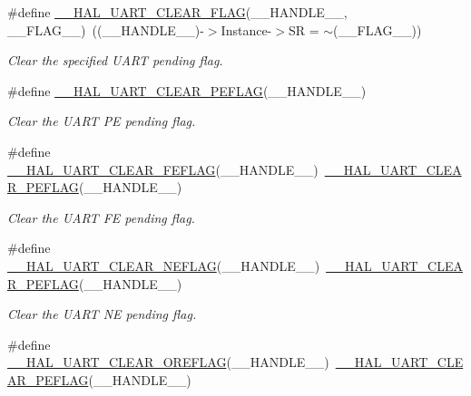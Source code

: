 \begin{DoxyCompactItemize}
\#define \hyperlink{group___u_a_r_t___exported___macros_ga9bd035161d41cde4f2568c7af06493bf}{\-\_\-\-\_\-\-H\-A\-L\-\_\-\-U\-A\-R\-T\-\_\-\-C\-L\-E\-A\-R\-\_\-\-F\-L\-A\-G}(\-\_\-\-\_\-\-H\-A\-N\-D\-L\-E\-\_\-\-\_\-, \-\_\-\-\_\-\-F\-L\-A\-G\-\_\-\-\_\-)~((\-\_\-\-\_\-\-H\-A\-N\-D\-L\-E\-\_\-\-\_\-)-\/$>$Instance-\/$>$S\-R = $\sim$(\-\_\-\-\_\-\-F\-L\-A\-G\-\_\-\-\_\-))
\begin{DoxyCompactList}\small\item\em Clear the specified U\-A\-R\-T pending flag. \end{DoxyCompactList}\item 
\#define \hyperlink{group___u_a_r_t___exported___macros_gaba5e19c60e0f37341b1585a380b84d49}{\-\_\-\-\_\-\-H\-A\-L\-\_\-\-U\-A\-R\-T\-\_\-\-C\-L\-E\-A\-R\-\_\-\-P\-E\-F\-L\-A\-G}(\-\_\-\-\_\-\-H\-A\-N\-D\-L\-E\-\_\-\-\_\-)
\begin{DoxyCompactList}\small\item\em Clear the U\-A\-R\-T P\-E pending flag. \end{DoxyCompactList}\item 
\#define \hyperlink{group___u_a_r_t___exported___macros_gae1dfc7777b089a10464841045b524caa}{\-\_\-\-\_\-\-H\-A\-L\-\_\-\-U\-A\-R\-T\-\_\-\-C\-L\-E\-A\-R\-\_\-\-F\-E\-F\-L\-A\-G}(\-\_\-\-\_\-\-H\-A\-N\-D\-L\-E\-\_\-\-\_\-)~\hyperlink{group___u_a_r_t___exported___macros_gaba5e19c60e0f37341b1585a380b84d49}{\-\_\-\-\_\-\-H\-A\-L\-\_\-\-U\-A\-R\-T\-\_\-\-C\-L\-E\-A\-R\-\_\-\-P\-E\-F\-L\-A\-G}(\-\_\-\-\_\-\-H\-A\-N\-D\-L\-E\-\_\-\-\_\-)
\begin{DoxyCompactList}\small\item\em Clear the U\-A\-R\-T F\-E pending flag. \end{DoxyCompactList}\item 
\#define \hyperlink{group___u_a_r_t___exported___macros_gaa1f69421585b3ada4d2b81d502a3ae6b}{\-\_\-\-\_\-\-H\-A\-L\-\_\-\-U\-A\-R\-T\-\_\-\-C\-L\-E\-A\-R\-\_\-\-N\-E\-F\-L\-A\-G}(\-\_\-\-\_\-\-H\-A\-N\-D\-L\-E\-\_\-\-\_\-)~\hyperlink{group___u_a_r_t___exported___macros_gaba5e19c60e0f37341b1585a380b84d49}{\-\_\-\-\_\-\-H\-A\-L\-\_\-\-U\-A\-R\-T\-\_\-\-C\-L\-E\-A\-R\-\_\-\-P\-E\-F\-L\-A\-G}(\-\_\-\-\_\-\-H\-A\-N\-D\-L\-E\-\_\-\-\_\-)
\begin{DoxyCompactList}\small\item\em Clear the U\-A\-R\-T N\-E pending flag. \end{DoxyCompactList}\item 
\#define \hyperlink{group___u_a_r_t___exported___macros_ga9cdc2f2d55eaaa7895996bf6848df42e}{\-\_\-\-\_\-\-H\-A\-L\-\_\-\-U\-A\-R\-T\-\_\-\-C\-L\-E\-A\-R\-\_\-\-O\-R\-E\-F\-L\-A\-G}(\-\_\-\-\_\-\-H\-A\-N\-D\-L\-E\-\_\-\-\_\-)~\hyperlink{group___u_a_r_t___exported___macros_gaba5e19c60e0f37341b1585a380b84d49}{\-\_\-\-\_\-\-H\-A\-L\-\_\-\-U\-A\-R\-T\-\_\-\-C\-L\-E\-A\-R\-\_\-\-P\-E\-F\-L\-A\-G}(\-\_\-\-\_\-\-H\-A\-N\-D\-L\-E\-\_\-\-\_\-)

\end{DoxyCompactItemize}
